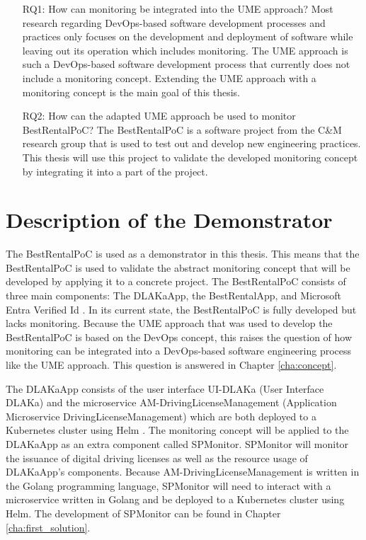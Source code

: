 \begin{enumerate}
	\item[RQ1:] How can monitoring be integrated into the UME approach?
	Most research regarding DevOps-based software development processes and practices only focuses
	on the development and deployment of software while leaving out its operation which
	includes monitoring. The UME approach is such a DevOps-based software development process that currently
	does not include a monitoring concept. Extending the UME approach with a monitoring concept is the main goal
	of this thesis.

	\item[RQ2:] How can the adapted UME approach be used to monitor BestRentalPoC?
	The BestRentalPoC is a software project from the C\&M research group that is used
	to test out and develop new engineering practices. This thesis will use this project
	to validate the developed monitoring concept by integrating it into a part of the project.
\end{enumerate}

\section{Description of the Demonstrator}
\label{sec:desc_demonstrator}

The BestRentalPoC is used as a demonstrator in this thesis.
This means that the BestRentalPoC is used to validate the abstract monitoring concept that will be developed
by applying it to a concrete project. The BestRentalPoC consists of three main components: The DLAKaApp, the BestRentalApp,
and Microsoft Entra Verified Id \cite{MIC-ENT}. In its current state, the BestRentalPoC is fully developed but lacks monitoring.
Because the UME approach that was used to develop the BestRentalPoC is based on the DevOps concept, this raises the question
of how monitoring can be integrated into a DevOps-based software engineering process like the UME approach.
This question is answered in Chapter \ref{cha:concept}.

The DLAKaApp consists of the user interface UI-DLAKa (User Interface DLAKa) and the microservice AM-DrivingLicenseManagement
(Application Microservice DrivingLicenseManagement) which are both deployed to a Kubernetes \cite{KUB-DOCS} cluster using Helm \cite{HEL-DOCS}.
The monitoring concept will be applied to the DLAKaApp as an extra component called SPMonitor.
SPMonitor will monitor the issuance of digital driving licenses as well as the resource usage of DLAKaApp's components. 
Because AM-DrivingLicenseManagement is written in the Golang programming language, SPMonitor will need to interact with a microservice
written in Golang and be deployed to a Kubernetes cluster using Helm. The development of SPMonitor can be found in Chapter \ref{cha:first_solution}.

